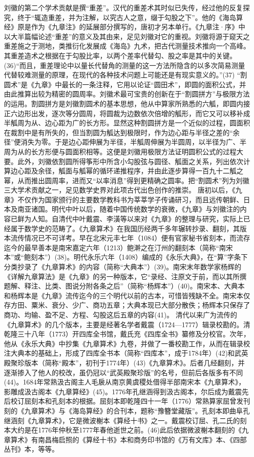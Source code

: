 \documentclass[a4paper,12pt,UTF8,twoside]{ctexbook}
\begin{document}
刘徽的第二个学术贡献是撰“重差”。汉代的重差术其时似已失传，经过他的反复探究，终于“辄造重差，并为注解，以究古人之意，缀于勾股之下”。他的《海岛算经》原是作为《九章注》的延展部分撰写的，唐初才另本单行。《九章注·序》中以大半篇幅论述“重差”的意义及其由来，足见刘徽对它的重视。刘徽将源于窥天之重差施之于测地，类推衍化发展成《海岛》九术，把古代测量技术推向一个高峰。其重差造术之根据在于勾股比率，以两个差率代替勾、股之率是其中的关键。(36)“而且，重差理论中以量长代替角的测量的这一方法所隐含的以多次简易测量代替较难测量的原理，在现代的各种技术问题上可能还是有现实意义的。”(37)
“割圆术”是《九章》中最长的一条注释，它用以论证“圆田术”，即圆的面积公式，并由此推算出较为精密的圆周率。刘徽术最可宝贵的创新在于“割圆拼方”与极限方法的运用。割圆拼方是刘徽割圆术的基本思想，他从中算家所熟悉的六觚，即圆内接正六边形出发，逐次等分圆周，将圆裁为边数依次倍增的觚形，而它又可以移补成半觚周为从、边心距为广的长方形。显然这种割圆拼方是一个近似的过程，圆面积在裁割中是有所失的，但当割圆为觚达到极限时，作为边心距与半径之差的“余径”便消失为零。于是边心距伸展为半径，半觚周伸展为半圆周，以半径为广、半周为从的长方形便与圆面积相等。这便是刘徽用极限方法证明圆积公式的过程大要。此外，刘徽依割圆所得筝形中所含小勾股弦与圆径、觚面之关系，列出依次计算边心距及余径，觚面与觚幂的循环递推程序，并由此逐步算得一百九十二觚之幂，从而推出圆周率，进而又“以率消息”得到更精确之圆率。把“割圆术”列为刘徽三大学术贡献之一，足见数学史界对此项古代出色创作的推崇。
唐初以后，《九章》不仅作为国家颁行的主要数学教科书为莘莘学子传诵研习，而且远传朝鲜、日本及南亚诸国。明代中叶以后，随着中国传统数学的衰微，《九章》与刘徽注的内容已鲜为人知。自清代中叶戴震、李潢等以来对《九章》的整理与研究，实际上已经属于数学史的范畴了。《九章算术》在我国历经两千多年辗转抄录、翻刻，其版本流传情况已不可详考。早在北宋元丰七年（1084）便有官家秘书省刻本，而流存迄今的最早善本是南宋嘉定六年（1213）鲍澣之在汀州的翻刻本（简称“南宋本”或“鲍刻本”）(38)。明代永乐六年（1408）编成的《永乐大典》，在“算”字条下分类抄录了《九章算术》的内容（简称“大典本”）(39)。南宋末年数学家杨辉的《详解九章算法》是《九章》的另一种版本，它“录经、注原文于前，而以其所撰题解、释注、比类、图说分附各条之后”（简称“杨辉本”）(40)。南宋本、大典本和杨辉本是《九章》流传迄今的三个明代以前的古本，可惜皆残缺不全。南宋本仅存方田、粟米、衰分、少广、商功五章；大典本现已大部分散佚；杨辉本只保存了商功、均输、盈不足、方程、勾股这后五章的内容(41)。
清代以来广为流传的《九章算术》的几个版本，主要是经著名学者戴震（1724—1777）辑录校勘的。清乾隆三十八年（1773）开四库全书馆，戴氏充《四库全书》纂修及分校官。次年，他从《永乐大典》中抄集《九章算术》九卷，并做了一番校勘工作，从而在辑录校注大典本的基础上，形成了四库全书本（简称“四库本”，成于1784年）(42)和武英殿聚珍版本（简称“殿本”，初刊于1774年）(43)《九章算术》。后者几经翻刻，并逐渐掺入了他人的校改，虽仍冠以“武英殿聚珍版”的名号，但前后各版多有不同(44)。1684年常熟汲古阁主人毛扆从南京黄虞稷处借得半部南宋本《九章算术》，影雕成汲古阁本《九章算经》(45)。1776年孔继涵得到汲古阁本，尔后成为戴震先后校订屈刻本和孔刻本的根据。屈刻本即乾隆四十一年（1776）常熟算家屈曾发刊刻的《九章算术》与《海岛算经》的合刊本，题称“豫簪堂藏版”。孔刻本即曲阜孔继涵刻《九章算术》，它是微波榭本《算经十书》之一。戴震校订屈、孔二氏的刻本大约是在1776年仲秋至1777年春他逝世之前。(46)此后依据微波榭本翻刻的《九章算术》有南昌梅启照的《算经十书》本和商务印书馆的《万有文库》本、《四部丛刊》本，等等。
\end{document}
